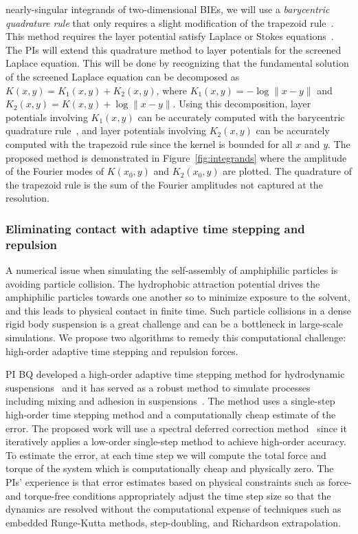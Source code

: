 nearly-singular integrands of two-dimensional BIEs, we will use a {\em
barycentric quadrature rule} that only requires a slight modification of
the trapezoid rule~\cite{ioa-pap-per1991}. This method requires the
layer potential satisfy Laplace or Stokes
equations~\cite{bar-wu-vee2015, chi-moo-qua2020}. The PIs will extend
this quadrature method to layer potentials for the screened Laplace
equation. This will be done by recognizing that the fundamental solution
of the screened Laplace equation can be decomposed as $K(x,y) = K_1(x,y)
+ K_2(x,y)$, where $K_1(x,y) = -\log\|x - y\|$ and $K_2(x,y) = K(x,y) +
\log\|x - y\|$. Using this decomposition, layer potentials involving
$K_1(x,y)$ can be accurately computed with the barycentric quadrature
rule~\cite{ioa-pap-per1991}, and layer potentials involving $K_2(x,y)$
can be accurately computed with the trapezoid rule since the kernel is
bounded for all $x$ and $y$. The proposed method is demonstrated in
Figure~\ref{fig:integrands} where the amplitude of the Fourier modes of
$K(x_0,y)$ and $K_2(x_0,y)$ are plotted. The quadrature of the trapezoid
rule is the sum of the Fourier amplitudes not captured at the
resolution.


\subsubsection{Eliminating contact with adaptive time stepping and
repulsion}
\label{subsec:timeStepping}

A numerical issue when simulating the self-assembly of amphiphilic
particles is avoiding particle collision. The hydrophobic attraction
potential drives the amphiphilic particles towards one another so to
minimize exposure to the solvent, and this leads to physical contact in
finite time. Such particle collisions in a dense rigid body suspension
is a great challenge and can be a bottleneck in large-scale simulations.
We propose two algorithms to remedy this computational challenge:
high-order adaptive time stepping and repulsion forces.

PI BQ developed a high-order adaptive time stepping method for
hydrodynamic suspensions~\cite{qua-bir2016} and it has served as a
robust method to simulate processes including mixing and adhesion in
suspensions~\cite{qua-vee-you2019, kab-qua-bir2017}. The method uses
a single-step high-order time stepping method and a computationally
cheap estimate of the error. The proposed work will use a spectral
deferred correction method~\cite{dut-gre-rok2000} since it iteratively
applies a low-order single-step method to achieve high-order accuracy.
To estimate the error, at each time step we will compute the total force
and torque of the system which is computationally cheap and physically
zero. The PIs' experience is that error estimates based on physical
constraints such as force- and torque-free conditions appropriately
adjust the time step size so that the dynamics are resolved without the
computational expense of techniques such as embedded Runge-Kutta
methods, step-doubling, and Richardson extrapolation.

